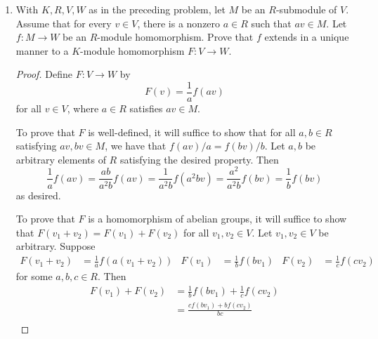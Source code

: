 \documentclass[../psets.tex]{subfiles}
\begin{document}
\begin{enumerate}
\begin{proof}
        as desired.
    \end{proof}
    \item With $K,R,V,W$ as in the preceding problem, let $M$ be an $R$-submodule of $V$. Assume that for every $v\in V$, there is a nonzero $a\in R$ such that $av\in M$. Let $f:M\to W$ be an $R$-module homomorphism. Prove that $f$ extends in a unique manner to a $K$-module homomorphism $F:V\to W$.
    \begin{proof}

        Define $F:V\to W$ by
        \begin{equation*}
            F(v) = \frac{1}{a}f(av)
        \end{equation*}
        for all $v\in V$, where $a\in R$ satisfies $av\in M$.\par
        To prove that $F$ is well-defined, it will suffice to show that for all $a,b\in R$ satisfying $av,bv\in M$, we have that $f(av)/a=f(bv)/b$. Let $a,b$ be arbitrary elements of $R$ satisfying the desired property. Then
        \begin{equation*}
            \frac{1}{a}f(av) = \frac{ab}{a^2b}f(av)
            = \frac{1}{a^2b}f(a^2bv)
            = \frac{a^2}{a^2b}f(bv)
            = \frac{1}{b}f(bv)
        \end{equation*}
        as desired.\par
        To prove that $F$ is a homomorphism of abelian groups, it will suffice to show that $F(v_1+v_2)=F(v_1)+F(v_2)$ for all $v_1,v_2\in V$. Let $v_1,v_2\in V$ be arbitrary. Suppose
        \begin{align*}
            F(v_1+v_2) &= \frac{1}{a}f(a(v_1+v_2))&
            F(v_1) &= \frac{1}{b}f(bv_1)&
            F(v_2) &= \frac{1}{c}f(cv_2)
        \end{align*}
        for some $a,b,c\in R$. Then
        \begin{align*}
            F(v_1)+F(v_2) &= \frac{1}{b}f(bv_1)+\frac{1}{c}f(cv_2)\\
            &= \frac{cf(bv_1)+bf(cv_2)}{bc}\\

\end{align*}
\end{proof}
\end{enumerate}
\end{document}
